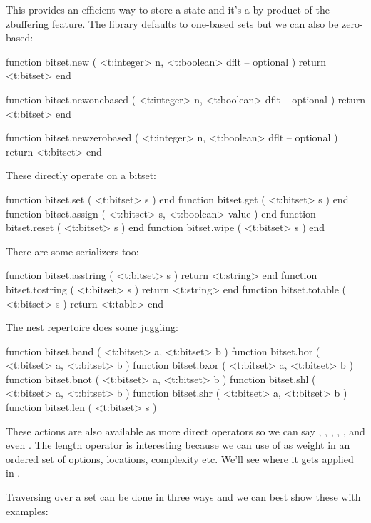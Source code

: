 \startsubsection[title=Bitset]

This provides an efficient way to store a state and it's a by-product of
the zbuffering feature. The library defaults to one-based sets but we can
also be zero-based:

\starttyping[option=LUA]
function bitset.new (
    <t:integer> n,
    <t:boolean> dflt -- optional
)
    return <t:bitset>
end

function bitset.newonebased  (
    <t:integer> n,
    <t:boolean> dflt -- optional
)
    return <t:bitset>
end

function bitset.newzerobased (
    <t:integer> n,
    <t:boolean> dflt -- optional
)
    return <t:bitset>
end
\stoptyping

These directly operate on a bitset:

\starttyping[option=LUA]
function bitset.set    ( <t:bitset> s ) end
function bitset.get    ( <t:bitset> s ) end
function bitset.assign ( <t:bitset> s, <t:boolean> value ) end
function bitset.reset  ( <t:bitset> s ) end
function bitset.wipe   ( <t:bitset> s ) end
\stoptyping

There are some serializers too:

\starttyping[option=LUA]
function bitset.asstring ( <t:bitset> s ) return <t:string> end
function bitset.tostring ( <t:bitset> s ) return <t:string> end
function bitset.totable  ( <t:bitset> s ) return <t:table>  end
\stoptyping

The nest repertoire does some juggling:

\starttyping[option=LUA]
function bitset.band ( <t:bitset> a, <t:bitset> b )
function bitset.bor  ( <t:bitset> a, <t:bitset> b )
function bitset.bxor ( <t:bitset> a, <t:bitset> b )
function bitset.bnot ( <t:bitset> a, <t:bitset> b )
function bitset.shl  ( <t:bitset> a, <t:bitset> b )
function bitset.shr  ( <t:bitset> a, <t:bitset> b )
function bitset.len  ( <t:bitset> s )
\stoptyping

These actions are also available as more direct operators so we can say , , , , , 
and even . The length operator is interesting because we can use of as
weight in an ordered set of options, locations, complexity etc. We'll see where
it gets applied in \CONTEXT.

Traversing over a set can be done in three ways and we can best show these with
examples:

\startbuffer
\startluacode

